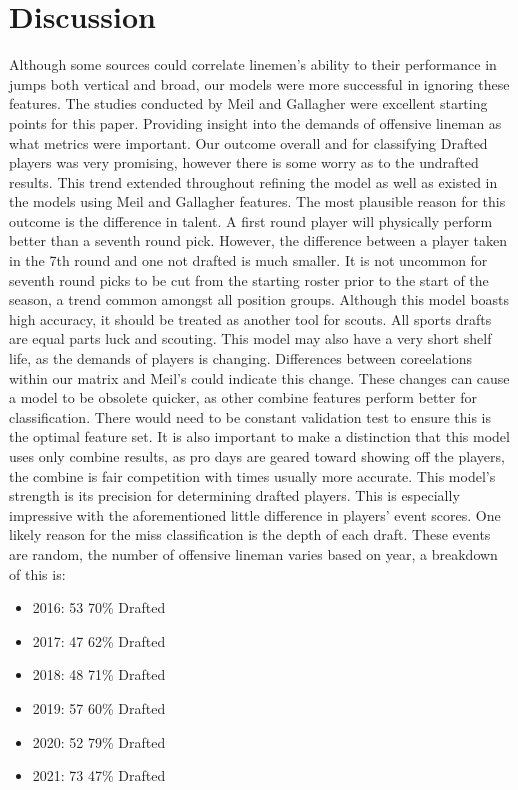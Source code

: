 \documentclass[confrence]{IEEEtran}
\begin{document}
\section*{Discussion}
Although some sources could correlate linemen's ability to their performance in jumps both vertical and broad, our models were more successful in ignoring these features.
The studies conducted by Meil and Gallagher were excellent starting points for this paper. Providing insight into the demands of offensive lineman as what metrics were important.
Our outcome overall and for classifying Drafted players was very promising, however there is some worry as to the undrafted results.
This trend extended throughout refining the model as well as existed in the models using Meil and Gallagher features.
The most plausible reason for this outcome is the difference in talent. A first round player will physically perform better than a seventh round pick. However, the difference between a player taken in the 7th round and one not drafted is much smaller.
It is not uncommon for seventh round picks to be cut from the starting roster prior to the start of the season, a trend common amongst all position groups.
Although this model boasts high accuracy, it should be treated as another tool for scouts. All sports drafts are equal parts luck and scouting.
This model may also have a very short shelf life, as the demands of players is changing. Differences between coreelations within our matrix and Meil's could indicate this change.
These changes can cause a model to be obsolete quicker, as other combine features perform better for classification.
There would need to be constant validation test to ensure this is the optimal feature set.
It is also important to make a distinction that this model uses only combine results, as pro days are geared toward showing off the players, the combine is fair competition with times usually more accurate.
This model's strength is its precision for determining drafted players. This is especially impressive with the aforementioned little difference in players' event scores.
One likely reason for the miss classification is the depth of each draft. These events are random, the number of offensive lineman varies based on year, a breakdown of this is:
\begin{itemize}
\item 2016: 53 70\% Drafted
\item 2017: 47 62\% Drafted
\item 2018: 48 71\% Drafted
\item 2019: 57 60\% Drafted
\item 2020: 52 79\% Drafted
\item 2021: 73 47\% Drafted
\end{itemize}
\end{document}
